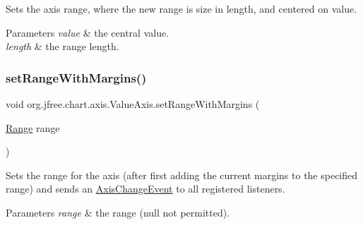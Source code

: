 Sets the axis range, where the new range is \textquotesingle{}size\textquotesingle{} in length, and centered on \textquotesingle{}value\textquotesingle{}.


\begin{DoxyParams}{Parameters}
{\em value} & the central value. \\
\hline
{\em length} & the range length. \\
\hline
\end{DoxyParams}
\mbox{\label{classorg_1_1jfree_1_1chart_1_1axis_1_1_value_axis_a399e3f7045339d3bf5cda69a7eafb482}} 
\subsubsection{\texorpdfstring{set\+Range\+With\+Margins()}{setRangeWithMargins()}\hspace{0.1cm}{\footnotesize\ttfamily [1/3]}}
{\footnotesize\ttfamily void org.\+jfree.\+chart.\+axis.\+Value\+Axis.\+set\+Range\+With\+Margins (\begin{DoxyParamCaption}\item[{\mbox{\hyperlink{classorg_1_1jfree_1_1data_1_1_range}{Range}}}]{range }\end{DoxyParamCaption})}

Sets the range for the axis (after first adding the current margins to the specified range) and sends an \mbox{\hyperlink{}{Axis\+Change\+Event}} to all registered listeners.


\begin{DoxyParams}{Parameters}
{\em range} & the range ({\ttfamily null} not permitted). \\
\hline
\end{DoxyParams}
\mbox{\label{classorg_1_1jfree_1_1chart_1_1axis_1_1_value_axis_a0dcad02972acb0c72c29d579e3dda5b2}} 
